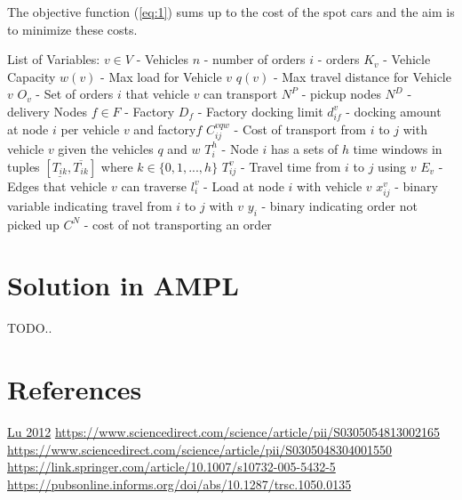 \documentclass[a4paper,12pt]{article}
\begin{document}
\par
The objective function (\ref{eq:1}) sums up to the cost of the spot cars and the aim is to minimize these costs. \newline \newline


List of Variables: \newline
$v \in V$ - Vehicles \newline
$n$ - number of orders\newline
$i$ - orders\newline
$K_v$ - Vehicle Capacity \newline
$w(v)$ - Max load for Vehicle $v$ \newline
$q(v)$ - Max travel distance for Vehicle $v$ \newline
$O_v$ - Set of orders $i$ that vehicle $v$ can transport \newline
$N^P$ - pickup nodes\newline
$N^D$ - delivery Nodes\newline
$f \in F$ - Factory\newline
$D_f$ - Factory docking limit\newline
$d_{if}^v$ - docking amount at node $i$ per vehicle $v$ and factory$f$ \newline
$C_{ij}^{v q w}$ - Cost of transport from $i$ to $j$ with vehicle $v$ given the vehicles $q$ and $w$ \newline
$T_i^h$ - Node $i$ has a sets of $h$ time windows in tuples $[ \underline{T_{ik}},  \overline{T_{ik}} ]$ where $k \in \{0,1,...,h\}$  \newline
$T_{ij}^v$ - Travel time from $i$ to $j$ using $v$
$E_v$ - Edges that vehicle $v$ can traverse \newline
$l_{i}^v$ - Load at node $i$ with vehicle $v$ \newline
$x_{ij}^v$ - binary variable indicating travel from $i$ to $j$ with $v$ \newline
$y_i$ - binary indicating order not picked up \newline
$C^N$ - cost of not transporting an order \newline

\section{Solution in AMPL}
TODO..

\section{References} \label{sec:Ref}

\href{http://www-bcf.usc.edu/~maged/publications/MultiplePickup.pdf}{Lu 2012} \newline
\url{https://www.sciencedirect.com/science/article/pii/S0305054813002165} \newline
\url{https://www.sciencedirect.com/science/article/pii/S0305048304001550} \newline
\url{https://link.springer.com/article/10.1007/s10732-005-5432-5} \newline
\url{https://pubsonline.informs.org/doi/abs/10.1287/trsc.1050.0135} \newline
\end{document}
